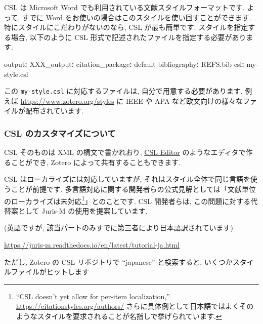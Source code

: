 \documentclass[
]{ltjsarticle}
\newenvironment{Shaded}{\begin{snugshade}}{\end{snugshade}}
\newcommand{\AttributeTok}[1]{\textcolor[rgb]{0.77,0.63,0.00}{#1}}
\newcommand{\FunctionTok}[1]{\textcolor[rgb]{0.00,0.00,0.00}{#1}}
\newcommand{\KeywordTok}[1]{\textcolor[rgb]{0.13,0.29,0.53}{\textbf{#1}}}
\begin{document}
CSL は Microsoft Word でも利用されている文献スタイルフォーマットです. よって, すでに Word をお使いの場合はこのスタイルを使い回すことができます. 特にスタイルにこだわりがないのなら, CSL が最も簡単です. スタイルを指定する場合, 以下のように CSL 形式で記述されたファイルを指定する必要があります.

\begin{Shaded}
\begin{Highlighting}[]
\FunctionTok{output}\KeywordTok{:}
\AttributeTok{    }\FunctionTok{XXX\_output}\KeywordTok{:}
\AttributeTok{      }\FunctionTok{citation\_package}\KeywordTok{:}\AttributeTok{ default}
\FunctionTok{bibliography}\KeywordTok{:}\AttributeTok{ REFS.bib}
\FunctionTok{csl}\KeywordTok{:}\AttributeTok{ my{-}style.csl}
\end{Highlighting}
\end{Shaded}

この \texttt{my-style.csl} に対応するファイルは, 自分で用意する必要があります. 例えば \url{https://www.zotero.org/styles} に IEEE や APA など欧文向けの様々なファイルが配布されています.

\hypertarget{csl-ux306eux30abux30b9ux30bfux30deux30a4ux30baux306bux3064ux3044ux3066}{%
\subsubsection{CSL のカスタマイズについて}\label{csl-ux306eux30abux30b9ux30bfux30deux30a4ux30baux306bux3064ux3044ux3066}}

CSL そのものは XML の構文で書かれおり, \href{https://editor.citationstyles.org/}{CSL Editor} のようなエディタで作ることができ, Zotero によって共有することもできます.

CSL はローカライズには対応していますが, それはスタイル全体で同じ言語を使うことが前提です. 多言語対応に関する開発者らの公式見解としては「文献単位のローカライズは未対応\footnote{``CSL doesn't yet allow for per-item localization,'' \url{https://citationstyles.org/authors/} さらに具体例として日本語ではよくそのようなスタイルを要求されることが名指しで挙げられています.}」とのことです. CSL 開発者らは, この問題に対する代替案として Juris-M の使用を提案しています.

(英語ですが, 該当パートのみすでに第三者により日本語訳されています)

\url{https://juris-m.readthedocs.io/en/latest/tutorial-ja.html}

ただし, Zotero の CSL リポジトリで ``japanese'' と検索すると, いくつかスタイルファイルがヒットします
\end{document}
